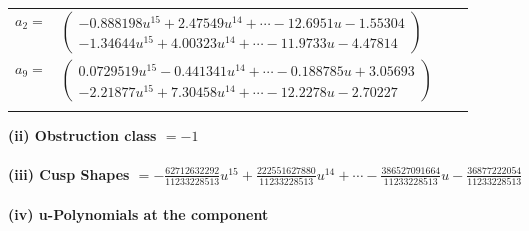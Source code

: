 \documentclass[1p]{elsarticle_modified}
\theoremstyle{definition}
\begin{document}
\begin{tabular}{m{7pt} m{180pt} m{7pt} m{180pt} }
\flushright $a_{2}=$&$\begin{pmatrix}-0.888198 u^{15}+2.47549 u^{14}+\cdots-12.6951 u-1.55304\\-1.34644 u^{15}+4.00323 u^{14}+\cdots-11.9733 u-4.47814\end{pmatrix}$ \\
\flushright $a_{9}=$&$\begin{pmatrix}0.0729519 u^{15}-0.441341 u^{14}+\cdots-0.188785 u+3.05693\\-2.21877 u^{15}+7.30458 u^{14}+\cdots-12.2278 u-2.70227\end{pmatrix}$\\&\end{tabular}
\flushleft \textbf{(ii) Obstruction class $= -1$}\\~\\
\flushleft \textbf{(iii) Cusp Shapes $= -\frac{62712632292}{11233228513} u^{15}+\frac{222551627880}{11233228513} u^{14}+\cdots-\frac{386527091664}{11233228513} u-\frac{36877222054}{11233228513}$}\\~\\
\newpage\renewcommand{\arraystretch}{1}
\flushleft \textbf{(iv) u-Polynomials at the component}\newline \\
\end{document}
